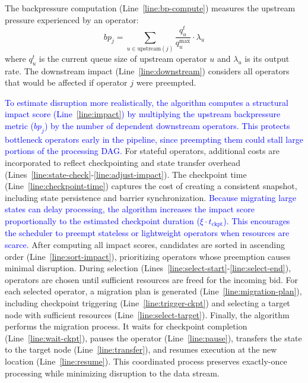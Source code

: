 \documentclass[lettersize,journal]{IEEEtran}
\begin{document}
The backpressure computation (Line~\ref{line:bp-compute}) measures the upstream pressure experienced by an operator:
\begin{equation}
bp_j = \sum_{u \in \text{upstream}(j)} \frac{q_u^t}{q_u^{\max}} \cdot \lambda_u
\end{equation}
where $q_u^t$ is the current queue size of upstream operator $u$ and $\lambda_u$ is its output rate. The downstream impact (Line~\ref{line:downstream}) considers all operators that would be affected if operator $j$ were preempted.

\textcolor{blue}{To estimate disruption more realistically, the algorithm computes a structural impact score (Line~\ref{line:impact}) by multiplying the upstream backpressure metric ($bp_j$) by the number of dependent downstream operators. This protects bottleneck operators early in the pipeline, since preempting them could stall large portions of the processing DAG.}
For stateful operators, additional costs are incorporated to reflect checkpointing and state transfer overhead (Lines~\ref{line:state-check}-\ref{line:adjust-impact}). The checkpoint time (Line~\ref{line:checkpoint-time}) captures the cost of creating a consistent snapshot, including state persistence and barrier synchronization. \textcolor{blue}{Because migrating large states can delay processing, the algorithm increases the impact score proportionally to the estimated checkpoint duration ($\xi \cdot t_{\text{ckpt}}$). This encourages the scheduler to preempt stateless or lightweight operators when resources are scarce.}
After computing all impact scores, candidates are sorted in ascending order (Line~\ref{line:sort-impact}), prioritizing operators whose preemption causes minimal disruption. During selection (Lines~\ref{line:select-start}-\ref{line:select-end}), operators are chosen until sufficient resources are freed for the incoming bid. For each selected operator, a migration plan is generated (Line~\ref{line:migration-plan}), including checkpoint triggering (Line~\ref{line:trigger-ckpt}) and selecting a target node with sufficient resources (Line~\ref{line:select-target}).
Finally, the algorithm performs the migration process. It waits for checkpoint completion (Line~\ref{line:wait-ckpt}), pauses the operator (Line~\ref{line:pause}), transfers the state to the target node (Line~\ref{line:transfer}), and resumes execution at the new location (Line~\ref{line:resume}). This coordinated process preserves exactly-once processing while minimizing disruption to the data stream.
\end{document}
